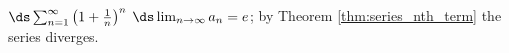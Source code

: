 {$\ds \sum_{n=1}^\infty \left(1+\frac1n\right)^n$
}
{$\ds \lim_{n\to\infty}a_n = e$; by Theorem \ref{thm:series_nth_term} the series diverges.
}
